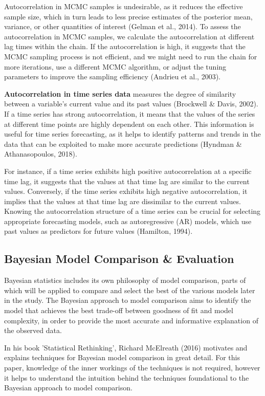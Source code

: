 Autocorrelation in MCMC samples is undesirable, as it reduces the effective
sample size, which in turn leads to less precise estimates of the posterior
mean, variance, or other quantities of interest (Gelman et al., 2014). To
assess the autocorrelation in MCMC samples, we calculate the autocorrelation at
different lag times within the chain. If the autocorrelation is high, it
suggests that the MCMC sampling process is not efficient, and we might need to
run the chain for more iterations, use a different MCMC algorithm, or adjust
the tuning parameters to improve the sampling efficiency (Andrieu et al.,
2003).

\textbf{Autocorrelation in time series data} measures the degree of similarity
between a variable's current value and its past values (Brockwell \& Davis,
2002). If a time series has strong autocorrelation, it means that the values of
the series at different time points are highly dependent on each other. This
information is useful for time series forecasting, as it helps to identify
patterns and trends in the data that can be exploited to make more accurate
predictions (Hyndman \& Athanasopoulos, 2018).

For instance, if a time series exhibits high positive autocorrelation at a
specific time lag, it suggests that the values at that time lag are similar to
the current values. Conversely, if the time series exhibits high negative
autocorrelation, it implies that the values at that time lag are dissimilar to
the current values. Knowing the autocorrelation structure of a time series can
be crucial for selecting appropriate forecasting models, such as autoregressive
(AR) models, which use past values as predictors for future values (Hamilton,
1994).

\subsection{Bayesian Model Comparison \& Evaluation}
Bayesian statistics includes its own philosophy of model comparison, parts of
which will be applied to compare and select the best of the various models
later in the study. The Bayesian approach to model comparison aims to identify
the model that achieves the best trade-off between goodness of fit and model
complexity, in order to provide the most accurate and informative explanation
of the observed data.

In his book 'Statistical Rethinking', Richard McElreath (2016) motivates and 
explains techniques for Bayesian model comparison in great detail. For this 
paper, knowledge of the inner workings of the techniques is not required, 
however it helps to understand the intuition behind the techniques foundational 
to the Bayesian approach to model comparison.

